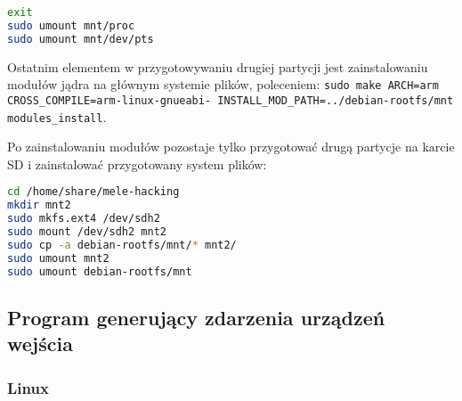 \begin{lstlisting}[language=bash]
exit
sudo umount mnt/proc
sudo umount mnt/dev/pts
\end{lstlisting}

Ostatnim elementem w przygotowywaniu drugiej partycji jest zainstalowaniu modułów jądra na głównym systemie plików, poleceniem: \lstinline{sudo make ARCH=arm CROSS_COMPILE=arm-linux-gnueabi- INSTALL_MOD_PATH=../debian-rootfs/mnt modules_install}.

Po zainstalowaniu modułów pozostaje tylko przygotować drugą partycje na karcie SD i zainstalować przygotowany system plików:
\begin{lstlisting}[language=bash]
cd /home/share/mele-hacking
mkdir mnt2
sudo mkfs.ext4 /dev/sdh2 
sudo mount /dev/sdh2 mnt2
sudo cp -a debian-rootfs/mnt/* mnt2/
sudo umount mnt2
sudo umount debian-rootfs/mnt
\end{lstlisting}

\subsection{Program generujący zdarzenia urządzeń wejścia}

\subsubsection{Linux}

